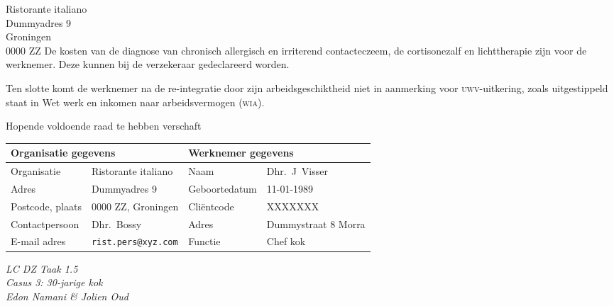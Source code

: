 \documentclass[foldmarks=true,foldmarks=blmtP,fromphone,
fromemail,fromlogo,version=last,sections]{scrlttr2}
\begin{document}
\begin{letter}{%
	Ristorante italiano\\
	Dummyadres 9\\
	Groningen\\
	0000 ZZ%
}
    De kosten van de diagnose van chronisch allergisch en irriterend contacteczeem, de cortisonezalf en lichttherapie zijn voor de werknemer. Deze kunnen bij de verzekeraar gedeclareerd worden.

    Ten slotte komt de werknemer na de re-integratie door zijn arbeidsgeschiktheid niet in aanmerking voor \textsc{uwv}-uitkering, zoals uitgestippeld staat in Wet werk en inkomen naar arbeidsvermogen (\textsc{wia}).

\closing{Hopende voldoende raad te hebben verschaft}
\vspace{\baselineskip}
\centering
    \begin{tabular}{*4l}
        \toprule
            \multicolumn{2}{l}{\textbf{Organisatie gegevens}} & \multicolumn{2}{l}{\textbf{Werknemer gegevens}}\\
        \midrule
            Organisatie      & Ristorante italiano               & Naam          & Dhr.~J~Visser        \\
            Adres            & Dummyadres 9                      & Geboortedatum & 11-01-1989           \\
            Postcode, plaats & 0000 ZZ, Groningen                 & Cliëntcode    & XXXXXXX              \\
            Contactpersoon   & Dhr.~Bossy                        & Adres         & Dummystraat 8 Morra  \\
            E-mail adres     & \texttt{\small rist.pers@xyz.com} & Functie       & Chef kok             \\
        \bottomrule
    \end{tabular}
\vfil
    \emph{LC DZ Taak 1.5\\Casus 3: 30-jarige kok\\Edon Namani \& Jolien Oud}
\vfil
\end{letter}
\end{document}
